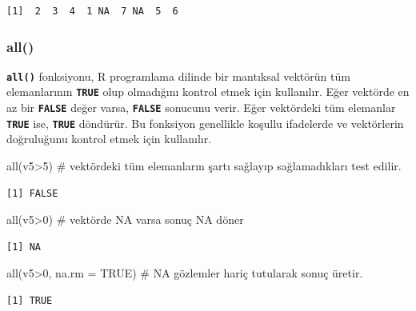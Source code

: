 \documentclass[
  letterpaper,
  DIV=11,
  numbers=noendperiod]{scrreprt}
\newenvironment{Shaded}{\begin{snugshade}}{\end{snugshade}}
\newcommand{\AttributeTok}[1]{\textcolor[rgb]{0.40,0.45,0.13}{#1}}
\newcommand{\CommentTok}[1]{\textcolor[rgb]{0.37,0.37,0.37}{#1}}
\newcommand{\ConstantTok}[1]{\textcolor[rgb]{0.56,0.35,0.01}{#1}}
\newcommand{\DecValTok}[1]{\textcolor[rgb]{0.68,0.00,0.00}{#1}}
\newcommand{\FunctionTok}[1]{\textcolor[rgb]{0.28,0.35,0.67}{#1}}
\newcommand{\NormalTok}[1]{\textcolor[rgb]{0.00,0.23,0.31}{#1}}
\newcommand{\SpecialCharTok}[1]{\textcolor[rgb]{0.37,0.37,0.37}{#1}}
\begin{document}
\begin{verbatim}
[1]  2  3  4  1 NA  7 NA  5  6
\end{verbatim}

\hypertarget{all}{%
\subsubsection{all()}\label{all}}

\textbf{\texttt{all()}} fonksiyonu, R programlama dilinde bir mantıksal
vektörün tüm elemanlarının \textbf{\texttt{TRUE}} olup olmadığını
kontrol etmek için kullanılır. Eğer vektörde en az bir
\textbf{\texttt{FALSE}} değer varsa, \textbf{\texttt{FALSE}} sonucunu
verir. Eğer vektördeki tüm elemanlar \textbf{\texttt{TRUE}} ise,
\textbf{\texttt{TRUE}} döndürür. Bu fonksiyon genellikle koşullu
ifadelerde ve vektörlerin doğruluğunu kontrol etmek için kullanılır.

\begin{Shaded}
\begin{Highlighting}[]
\FunctionTok{all}\NormalTok{(v5}\SpecialCharTok{\textgreater{}}\DecValTok{5}\NormalTok{) }\CommentTok{\# vektördeki tüm elemanların şartı sağlayıp sağlamadıkları test edilir.}
\end{Highlighting}
\end{Shaded}

\begin{verbatim}
[1] FALSE
\end{verbatim}

\begin{Shaded}
\begin{Highlighting}[]
\FunctionTok{all}\NormalTok{(v5}\SpecialCharTok{\textgreater{}}\DecValTok{0}\NormalTok{) }\CommentTok{\# vektörde NA varsa sonuç NA döner}
\end{Highlighting}
\end{Shaded}

\begin{verbatim}
[1] NA
\end{verbatim}

\begin{Shaded}
\begin{Highlighting}[]
\FunctionTok{all}\NormalTok{(v5}\SpecialCharTok{\textgreater{}}\DecValTok{0}\NormalTok{, }\AttributeTok{na.rm =} \ConstantTok{TRUE}\NormalTok{) }\CommentTok{\# NA gözlemler hariç tutularak sonuç üretir.}
\end{Highlighting}
\end{Shaded}

\begin{verbatim}
[1] TRUE
\end{verbatim}
\end{document}
